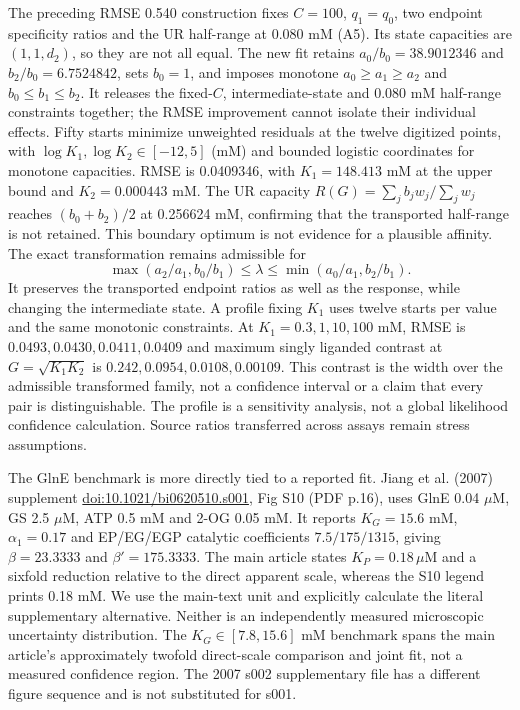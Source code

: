 \documentclass[11pt]{article}
\begin{document}
The preceding RMSE 0.540 construction fixes $C=100$, $q_1=q_0$, two endpoint specificity ratios and the UR half-range at 0.080 mM (A5). Its state capacities are $(1,1,d_2)$, so they are not all equal. The new fit retains $a_0/b_0=38.9012346$ and $b_2/b_0=6.7524842$, sets $b_0=1$, and imposes monotone $a_0\geq a_1\geq a_2$ and $b_0\leq b_1\leq b_2$. It releases the fixed-$C$, intermediate-state and 0.080 mM half-range constraints together; the RMSE improvement cannot isolate their individual effects. Fifty starts minimize unweighted residuals at the twelve digitized points, with $\log K_1,\log K_2\in[-12,5]$ (mM) and bounded logistic coordinates for monotone capacities. RMSE is 0.0409346, with $K_1=148.413$ mM at the upper bound and $K_2=0.000443$ mM. The UR capacity $R(G)=\sum_j b_jw_j/\sum_j w_j$ reaches $(b_0+b_2)/2$ at 0.256624 mM, confirming that the transported half-range is not retained. This boundary optimum is not evidence for a plausible affinity. The exact transformation remains admissible for
\[
 \max(a_2/a_1,b_0/b_1)\leq\lambda\leq\min(a_0/a_1,b_2/b_1).
\]
It preserves the transported endpoint ratios as well as the response, while changing the intermediate state. A profile fixing $K_1$ uses twelve starts per value and the same monotonic constraints. At $K_1=0.3,1,10,100$ mM, RMSE is $0.0493,0.0430,0.0411,0.0409$ and maximum singly liganded contrast at $G=\sqrt{K_1K_2}$ is $0.242,0.0954,0.0108,0.00109$. This contrast is the width over the admissible transformed family, not a confidence interval or a claim that every pair is distinguishable. The profile is a sensitivity analysis, not a global likelihood confidence calculation. Source ratios transferred across assays remain stress assumptions.

The GlnE benchmark is more directly tied to a reported fit. Jiang et al. (2007) supplement \href{https://doi.org/10.1021/bi0620510.s001}{doi:10.1021/bi0620510.s001}, Fig S10 (PDF p.16), uses GlnE 0.04 $\mu$M, GS 2.5 $\mu$M, ATP 0.5 mM and 2-OG 0.05 mM. It reports $K_G=15.6$ mM, $\alpha_1=0.17$ and EP/EG/EGP catalytic coefficients $7.5/175/1315$, giving $\beta=23.3333$ and $\beta'=175.3333$. The main article states $K_P=0.18\,\mu$M and a sixfold reduction relative to the direct apparent scale, whereas the S10 legend prints 0.18 mM. We use the main-text unit and explicitly calculate the literal supplementary alternative. Neither is an independently measured microscopic uncertainty distribution. The $K_G\in[7.8,15.6]$ mM benchmark spans the main article's approximately twofold direct-scale comparison and joint fit, not a measured confidence region. The 2007 s002 supplementary file has a different figure sequence and is not substituted for s001.
\end{document}
